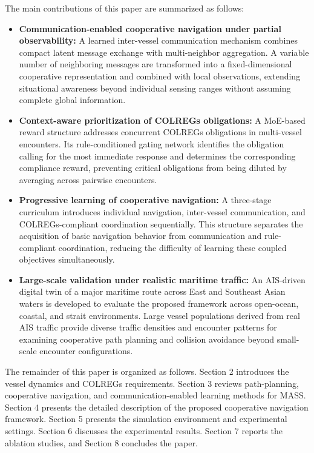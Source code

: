 \documentclass[final,5p,times,twocolumn]{elsarticle}
\begin{document}
{The main contributions of this paper are summarized as follows:

\begin{itemize}
    \item \textbf{Communication-enabled cooperative navigation under partial observability:} A learned inter-vessel communication mechanism combines compact latent message exchange with multi-neighbor aggregation. A variable number of neighboring messages are transformed into a fixed-dimensional cooperative representation and combined with local observations, extending situational awareness beyond individual sensing ranges without assuming complete global information.

    \item \textbf{Context-aware prioritization of COLREGs obligations:} A MoE-based reward structure addresses concurrent COLREGs obligations in multi-vessel encounters. Its rule-conditioned gating network identifies the obligation calling for the most immediate response and determines the corresponding compliance reward, preventing critical obligations from being diluted by averaging across pairwise encounters.
    
    \item \textbf{Progressive learning of cooperative navigation:} A three-stage curriculum introduces individual navigation, inter-vessel communication, and COLREGs-compliant coordination sequentially. This structure separates the acquisition of basic navigation behavior from communication and rule-compliant coordination, reducing the difficulty of learning these coupled objectives simultaneously.
    
    \item \textbf{Large-scale validation under realistic maritime traffic:} An AIS-driven digital twin of a major maritime route across East and Southeast Asian waters is developed to evaluate the proposed framework across open-ocean, coastal, and strait environments. Large vessel populations derived from real AIS traffic provide diverse traffic densities and encounter patterns for examining cooperative path planning and collision avoidance beyond small-scale encounter configurations.
\end{itemize}

The remainder of this paper is organized as follows. Section 2 introduces the vessel dynamics and COLREGs requirements. Section 3 reviews path-planning, cooperative navigation, and communication-enabled learning methods for MASS. Section 4 presents the detailed description of the proposed cooperative navigation framework. Section 5
presents the simulation environment and experimental settings. Section 6 discusses the experimental results. Section 7 reports the ablation studies, and Section 8 concludes the paper.
}
\end{document}
